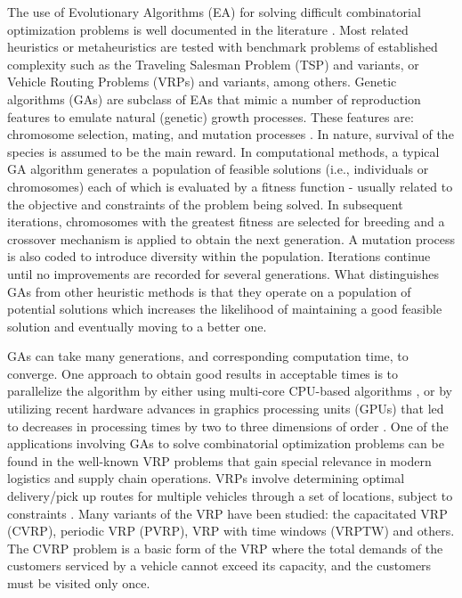 \documentclass[acmsmall]{acmart}
\begin{document}
The use of Evolutionary Algorithms (EA) for solving difficult combinatorial optimization problems is well documented in the literature \cite{ alzyadat2020genetic, baker2003genetic}. Most related heuristics or metaheuristics are tested with benchmark problems of established complexity such as the Traveling Salesman Problem (TSP) and variants, or Vehicle Routing Problems (VRPs) and variants, among others.  Genetic algorithms (GAs) are subclass of EAs that mimic a number of reproduction features to emulate natural (genetic) growth processes. These features are: chromosome selection, mating, and mutation processes \cite{bauer1994genetic}. In nature, survival of the species is assumed to be the main reward. In computational methods, a typical GA algorithm generates a population of feasible solutions (i.e., individuals or chromosomes) each of which is evaluated by a fitness function - usually related to the objective and constraints of the problem being solved. In subsequent iterations, chromosomes with the greatest fitness are selected for breeding and a crossover mechanism is applied to obtain the next generation. A mutation process is also coded to introduce diversity within the population. Iterations continue until no improvements are recorded for several generations. What distinguishes GAs from other heuristic methods is that they operate on a population of potential solutions which increases the likelihood of maintaining a good feasible solution and eventually moving to a better one. 

GAs can take many generations, and corresponding computation time, to converge. One approach to obtain good results in acceptable times is to parallelize the algorithm by either using multi-core CPU-based algorithms \cite{rey2018cpu}, or by utilizing recent hardware advances in graphics processing units (GPUs) \cite{benaini2018genetic, coelho2016integrated} that led to decreases in processing times by two to three dimensions of order \cite{abdelatti2021Op}. One of the applications involving GAs to solve combinatorial optimization problems can be found in the well-known VRP problems that gain special relevance in modern logistics and supply chain operations. VRPs involve determining optimal delivery/pick up routes for multiple vehicles through a set of locations, subject to constraints \cite{dantzig1959truck}. Many variants of the VRP have been studied: the capacitated VRP (CVRP), periodic VRP (PVRP),  VRP with time windows (VRPTW) and others. The CVRP problem is a basic form of the VRP where the total demands of the customers serviced by a vehicle cannot exceed its capacity, and the customers must be visited only once. 
\end{document}
